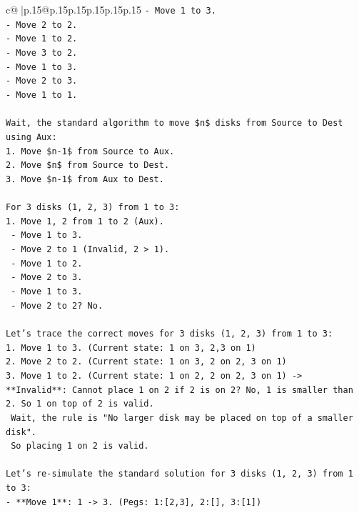 \documentclass{article}
\begin{document}
{\begin{supertabular}{c@{$\;$}|p{.15\linewidth}@{}p{.15\linewidth}p{.15\linewidth}p{.15\linewidth}p{.15\linewidth}p{.15\linewidth}}
{{{\texttt{{-} Move 1 to 3.} \\
\texttt{{-} Move 2 to 2.} \\
\texttt{{-} Move 1 to 2.} \\
\texttt{{-} Move 3 to 2.} \\
\texttt{{-} Move 1 to 3.} \\
\texttt{{-} Move 2 to 3.} \\
\texttt{{-} Move 1 to 1.} \\
\\ 
\texttt{Wait, the standard algorithm to move \$n\$ disks from Source to Dest using Aux:} \\
\texttt{1. Move \$n{-}1\$ from Source to Aux.} \\
\texttt{2. Move \$n\$ from Source to Dest.} \\
\texttt{3. Move \$n{-}1\$ from Aux to Dest.} \\
\\ 
\texttt{For 3 disks (1, 2, 3) from 1 to 3:} \\
\texttt{1. Move 1, 2 from 1 to 2 (Aux).} \\
\texttt{   {-} Move 1 to 3.} \\
\texttt{   {-} Move 2 to 1 (Invalid, 2 > 1).} \\
\texttt{   {-} Move 1 to 2.} \\
\texttt{   {-} Move 2 to 3.} \\
\texttt{   {-} Move 1 to 3.} \\
\texttt{   {-} Move 2 to 2? No.} \\
\\ 
\texttt{Let's trace the correct moves for 3 disks (1, 2, 3) from 1 to 3:} \\
\texttt{1. Move 1 to 3. (Current state: 1 on 3, 2,3 on 1)} \\
\texttt{2. Move 2 to 2. (Current state: 1 on 3, 2 on 2, 3 on 1)} \\
\texttt{3. Move 1 to 2. (Current state: 1 on 2, 2 on 2, 3 on 1) {-}> **Invalid**: Cannot place 1 on 2 if 2 is on 2? No, 1 is smaller than 2. So 1 on top of 2 is valid.} \\
\texttt{   Wait, the rule is "No larger disk may be placed on top of a smaller disk".} \\
\texttt{   So placing 1 on 2 is valid.} \\
\\ 
\texttt{Let's re{-}simulate the standard solution for 3 disks (1, 2, 3) from 1 to 3:} \\
\texttt{{-} **Move 1**: 1 {-}> 3. (Pegs: 1:{[}2,3{]}, 2:{[}{]}, 3:{[}1{]})} \\
}}}
\end{supertabular}}
\end{document}
